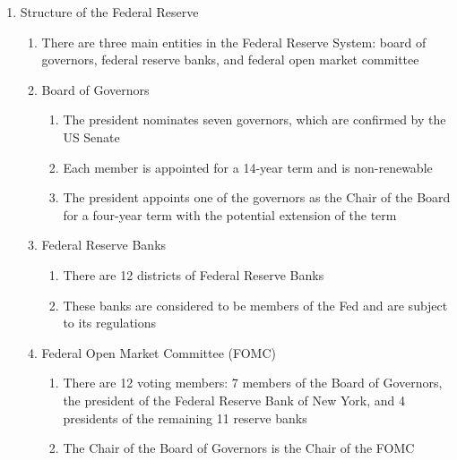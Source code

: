 \documentclass[12pt]{article}
\begin{document}
\begin{enumerate}
      \item Structure of the Federal Reserve

        \begin{enumerate}

          \item There are three main entities in the Federal Reserve System: board of governors, federal reserve banks, and federal open market committee

          \item Board of Governors

            \begin{enumerate}

              \item The president nominates seven governors, which are confirmed by the US Senate

              \item Each member is appointed for a 14-year term and is non-renewable

              \item The president appoints one of the governors as the Chair of the Board for a four-year term with the potential extension of the term

            \end{enumerate}

          \item Federal Reserve Banks

            \begin{enumerate}

              \item There are 12 districts of Federal Reserve Banks

              \item These banks are considered to be members of the Fed and are subject to its regulations

            \end{enumerate}

          \item Federal Open Market Committee (FOMC)

            \begin{enumerate}

              \item There are 12 voting members: 7 members of the Board of Governors, the president of the Federal Reserve Bank of New York, and 4 presidents of the remaining 11 reserve banks

              \item The Chair of the Board of Governors is the Chair of the FOMC


\end{enumerate}
\end{enumerate}
\end{enumerate}
\end{document}
